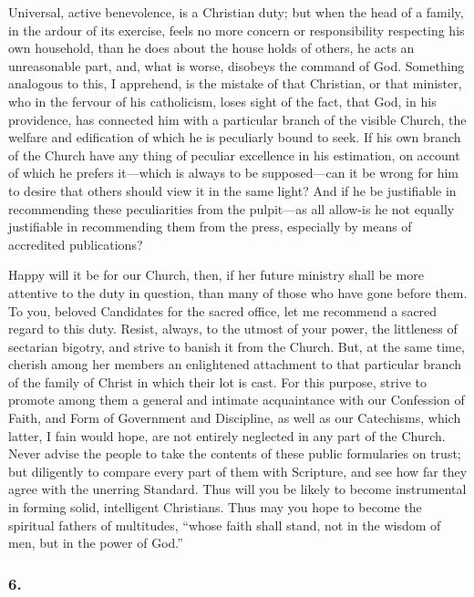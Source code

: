 \documentclass[
]{book}
\begin{document}
Universal, active benevolence, is a Christian duty; but when the head of a family, in the ardour of its exercise, feels no more concern or responsibility respecting his own household, than he does about the house holds of others, he acts an unreasonable part, and, what is worse, disobeys the command of God. Something analogous to this, I apprehend, is the mistake of that Christian, or that minister, who in the fervour of his catholicism, loses sight of the fact, that God, in his providence, has connected him with a particular branch of the visible Church, the welfare and edification of which he is peculiarly bound to seek. If his own branch of the Church have any thing of peculiar excellence in his estimation, on account of which he prefers it---which is always to be supposed---can it be wrong for him to desire that others should view it in the same light? And if he be justifiable in recommending these peculiarities from the pulpit---as all allow-is he not equally justifiable in recommending them from the press, especially by means of accredited publications?

Happy will it be for our Church, then, if her future ministry shall be more attentive to the duty in question, than many of those who have gone before them. To you, beloved Candidates for the sacred office, let me recommend a sacred regard to this duty. Resist, always, to the utmost of your power, the littleness of sectarian bigotry, and strive to banish it from the Church. But, at the same time, cherish among her members an enlightened attachment to that particular branch of the family of Christ in which their lot is cast. For this purpose, strive to promote among
them a general and intimate acquaintance with our Confession of Faith, and Form of Government and Discipline, as well as our Catechisms, which latter, I fain would hope, are not entirely neglected in any part of the Church. Never advise the people to take the contents of these public formularies on trust; but diligently to compare every part of them with Scripture, and see how far they agree with the unerring Standard. Thus will you be likely to become instrumental in forming solid, intelligent Christians. Thus may you hope to become the spiritual fathers of multitudes, ``whose faith shall stand, not in the wisdom of men, but in the power of God.''

\hypertarget{section-17}{%
\subsubsection*{6.}\label{section-17}}
\end{document}
